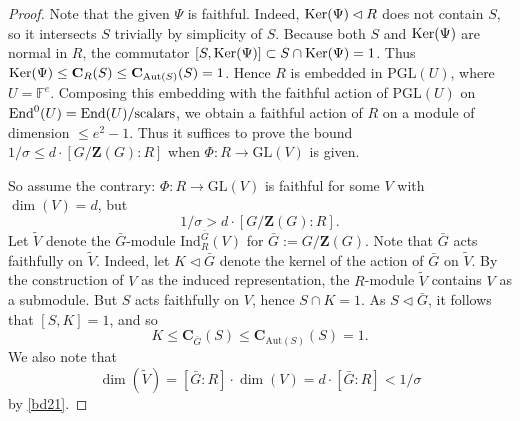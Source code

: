 \documentclass[11pt]{amsart}
\theoremstyle{plain}
\theoremstyle{definition}
\numberwithin{thm}{section}
\numberwithin{equation}{thm}
\newcommand{\End}{{\rm End}}
\newcommand{\Ker}{{\rm Ker}}
\newcommand{\Aut}{\mathrm{Aut}}
\newcommand{\Ind}{\mathrm{Ind}}
\newcommand{\GL}{\mathrm{GL}}
\newcommand{\PGL}{\mathrm{PGL}}
\newcommand{\F}{{\mathbb F}}
\newcommand{\0}{\emptyset}
\newcommand{\ZB}{{\mathbf Z}}
\newcommand{\CB}{{\mathbf C}}
\begin{document}
\begin{proof}
Note that the given $\Psi$ is faithful.
Indeed, $\Ker(\Psi) \lhd R$ does not contain $S$, so it
intersects $S$ trivially by simplicity of $S$. Because both $S$ and  $\Ker(\Psi)$ are normal in $R$, the commutator $[S,  \Ker(\Psi) ]  \subset S \cap  \Ker(\Psi) =1$. Thus $\Ker(\Psi) \leq \CB_R(S) \le \CB_{\Aut(S)}(S)=1$. Hence
$R$ is embedded in $\PGL(U)$, where $U = \F^e$. Composing this embedding with the faithful action of $\PGL(U)$ on 
$\End^0(U) = \End(U)/{\rm scalars}$, we obtain a faithful action of $R$ on a module of dimension $\leq e^2-1$. 
Thus it suffices to prove the bound 
$1/\sigma \leq d\cdot [G/\ZB(G):R]$ 
when $\Phi: R \to \GL(V)$ is given.

So assume the contrary: $\Phi: R \to \GL(V)$ is faithful for some $V$ with $\dim(V)=d$, but
\begin{equation}\label{bd21}
 1/\sigma > d \cdot [G/\ZB(G):R].
\end{equation} 
Let $\tilde V$ denote the $\bar{G}$-module $\Ind^{\bar{G}}_R(V)$ for $\bar{G}:=G/\ZB(G)$. 
Note that $\bar{G}$ acts faithfully on $\tilde V$. Indeed, let $K \lhd \bar{G}$ denote the kernel of the action of $\bar{G}$ on $\tilde V$. 
By the construction of $V$ as the induced representation, the $R$-module $\tilde V$ contains $V$ as a submodule. But $S$ acts faithfully on $V$, hence
$S \cap K=1$. As $S \lhd \bar{G}$, it follows that $[S,K]=1$, and so 
$$K \leq \CB_{\bar{G}}(S) \leq \CB_{\Aut(S)}(S)=1.$$  
We also note that
$$\dim(\tilde V) = [\bar{G}:R]\cdot \dim(V) =  d \cdot [\bar{G}:R] < 1/\sigma$$
by \eqref{bd21}.


\end{proof}
\end{document}
